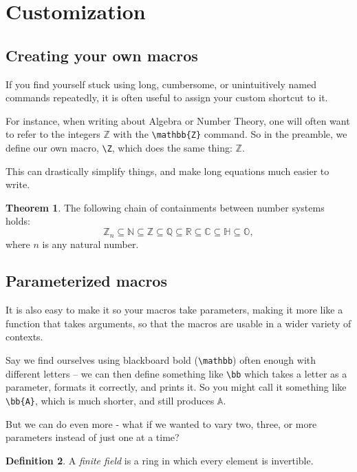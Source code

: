 \documentclass[11pt,letterpaper,titlepage]{article}
\numberwithin{equation}{section}
\numberwithin{figure}{section}
\numberwithin{table}{section}
\numberwithin{algorithm}{section}
\theoremstyle{definition}
\newtheorem{theorem}{Theorem}[section] %
\newtheorem{definition}[theorem]{Definition} %
\newcommand{\N}{\mathbb{N}}
\newcommand{\Z}{\mathbb{Z}}
\newcommand{\Q}{\mathbb{Q}}
\newcommand{\R}{\mathbb{R}}
\newcommand{\C}{\mathbb{C}}
\newcommand{\Qu}{\mathbb{H}}
\newcommand{\Oc}{\mathbb{O}}
\newcommand{\bb}[1]{\mathbb{#1}}
\begin{document}
\section{Customization}
    \subsection{Creating your own macros}
    If you find yourself stuck using long, cumbersome, or unintuitively named commands repeatedly, it is often useful to assign your custom shortcut to it.
    
    For instance, when writing about Algebra or Number Theory, one will often want to refer to the integers $\mathbb{Z}$ with the \verb$\mathbb{Z}$ command. So in the preamble, we define our own macro, \verb$\Z$, which does the same thing: $\Z$.
    
    
    This can drastically simplify things, and make long equations much easier to write.
    
    \begin{theorem}
    The following chain of containments between number systems holds:
    \[
    \Z_n \subseteq \N \subseteq \Z \subseteq \Q \subseteq \R \subseteq \C \subseteq \Qu \subseteq \Oc,
    \]
    where $n$ is any natural number.
    \end{theorem}

    \subsection{Parameterized macros}
    It is also easy to make it so your macros take parameters, making it more like a function that takes arguments, so that the macros are usable in a wider variety of contexts.
    
    Say we find ourselves using blackboard bold (\verb$\mathbb$) often enough with different letters -- we can then define something like \verb$\bb$ which takes a letter as a parameter, formats it correctly, and prints it. So you might call it something like \verb$\bb{A}$, which is much shorter, and still produces $\bb{A}$.
    
    But we can do even more - what if we wanted to vary two, three, or more parameters instead of just one at a time?
    
    \begin{definition} A \textit{finite field} is a ring in which every element is invertible.
    \end{definition}
    
\end{document}
